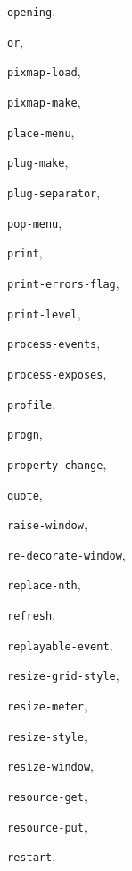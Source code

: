 \begin{theindex}
\item {\tt opening}, {\bf\pageref{opening}}
\item {\tt or}, {\bf\pageref{or}}
\item {\tt pixmap-load}, {\bf\pageref{pixmap-load}}
\item {\tt pixmap-make}, {\bf\pageref{pixmap-make}}
\item {\tt place-menu}, {\bf\pageref{place-menu}}
\item {\tt plug-make}, {\bf\pageref{plug-make}}
\item {\tt plug-separator}, {\bf\pageref{plug-separator}}
\item {\tt pop-menu}, {\bf\pageref{pop-menu}}
\item {\tt print}, {\bf\pageref{print}}
\item {\tt print-errors-flag}, {\bf\pageref{print-errors-flag}}
\item {\tt print-level}, {\bf\pageref{print-level}}
\item {\tt process-events}, {\bf\pageref{process-events}}
\item {\tt process-exposes}, {\bf\pageref{process-exposes}}
\item {\tt profile}, {\bf\pageref{standard-profile}}
\item {\tt progn}, {\bf\pageref{progn}}
\item {\tt property-change}, {\bf\pageref{property-change}}
\item {\tt quote}, {\bf\pageref{quote}}
\item {\tt raise-window}, {\bf\pageref{raise-window}}
\item {\tt re-decorate-window}, {\bf\pageref{re-decorate-window}}
\item {\tt replace-nth}, {\bf\pageref{replace-nth}}
\item {\tt refresh}, {\bf\pageref{refresh}}
\item {\tt replayable-event}, {\bf\pageref{replayable-event}}
\item {\tt resize-grid-style}, {\bf\pageref{resize-grid-style}}
\item {\tt resize-meter}, {\bf\pageref{resize-meter}}
\item {\tt resize-style}, {\bf\pageref{resize-style}}
\item {\tt resize-window}, {\bf\pageref{resize-window}}
\item {\tt resource-get}, {\bf\pageref{resource-get}}
\item {\tt resource-put}, {\bf\pageref{resource-put}}
\item {\tt restart}, {\bf\pageref{restart}}

\end{theindex}
